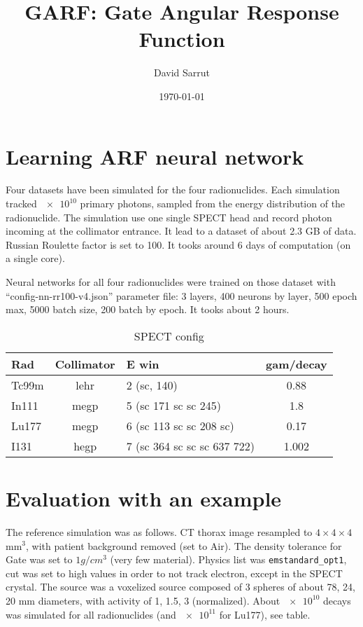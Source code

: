 \documentclass[11pt,final,a4paper]{article}
\begin{document}
\thispagestyle{fancy}

\title{GARF: Gate Angular Response Function}
\author{David Sarrut}
\date{\today}

\maketitle

\section{Learning ARF neural network}

Four datasets have been simulated for the four radionuclides. Each
simulation tracked $\num{e10}$ primary photons, sampled from the
energy distribution of the radionuclide. The simulation use one single
SPECT head and record photon incoming at the collimator entrance. It
lead to a dataset of about 2.3 GB of data. Russian Roulette factor is
set to 100. It tooks around 6 days of computation (on a single core).


Neural networks for all four radionuclides were trained on those
dataset with ``config-nn-rr100-v4.json'' parameter file: 3 layers, 400
neurons by layer, 500 epoch max, 5000 batch size, 200 batch by
epoch. It tooks about 2 hours.

\begin{table}[htbp]
  \centering
  \begin{tabular}[htbp]{lclc}
    Rad & Collimator & E win & gam/decay \\\hline
    Tc99m & lehr & 2 (sc, 140) & 0.88 \\
    In111 & megp & 5 (sc 171 sc sc 245) &  1.8 \\
    Lu177 & megp & 6 (sc 113 sc sc 208 sc) & 0.17 \\
    I131 & hegp & 7 (sc 364 sc sc sc 637 722) & 1.002 \\
  \end{tabular}
  \caption{SPECT config}
  \label{tab:spect}  
\end{table}

\section{Evaluation with an example}

The reference simulation was as follows. CT thorax image resampled to
$4 \times 4 \times 4$ mm$^3$, with patient background removed (set to
Air). The density tolerance for Gate was set to $1 g/cm^3$ (very few
material). Physics list was \verb+emstandard_opt1+, cut was set to high
values in order to not track electron, except in the SPECT
crystal. The source was a voxelized source composed of 3 spheres of
about 78, 24, 20 mm diameters, with activity of 1, 1.5, 3
(normalized). About $\num{e10}$ decays was simulated for all
radionuclides (and $\num{e11}$ for Lu177), see table.
\end{document}

